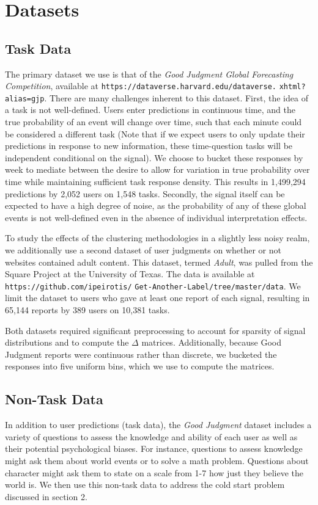\documentclass{article}
\begin{document}
\section{Datasets}
\subsection{Task Data}
The primary dataset we use is that of the \emph{Good Judgment Global Forecasting Competition}, available at \texttt{https://dataverse.harvard.edu/dataverse.}
\texttt{xhtml?alias=gjp}. There are many challenges inherent to this dataset. First, the idea of a task is not well-defined. Users enter predictions in continuous time, and the true probability of an event will change over time, such that each minute could be considered a different task (Note that if we expect users to only update their predictions in response to new information, these time-question tasks will be independent conditional on the signal). We choose to bucket these responses by week to mediate between the desire to allow for variation in true probability over time while maintaining sufficient task response density. This results in 1,499,294 predictions by 2,052 users on 1,548 tasks. Secondly, the signal itself can be expected to have a high degree of noise, as the probability of any of these global events is not well-defined even in the absence of individual interpretation effects. 

To study the effects of the clustering methodologies in a slightly less noisy realm, we additionally use a second dataset of user judgments on whether or not websites contained adult content. This dataset, termed \emph{Adult}, was pulled from the Square Project at the University of Texas. The data is available at \texttt{https://github.com/ipeirotis/}
\texttt{Get-Another-Label/tree/master/data}. We limit the dataset to users who gave at least one report of each signal, resulting in 65,144 reports by 389 users on 10,381 tasks.

Both datasets required significant preprocessing to account for sparsity of signal distributions and to compute the $\Delta$ matrices. Additionally, because Good Judgment reports were continuous rather than discrete, we bucketed the responses into five uniform bins, which we use to compute the matrices.

\subsection{Non-Task Data}
In addition to user predictions (task data), the \emph{Good Judgment} dataset includes a variety of questions to assess the knowledge and ability of each user as well as their potential psychological biases. For instance, questions to assess knowledge might ask them about world events or to solve a math problem. Questions about character might ask them to state on a scale from 1-7 how just they believe the world is. We then use this non-task data to address the cold start problem discussed in section 2. 
\end{document}
